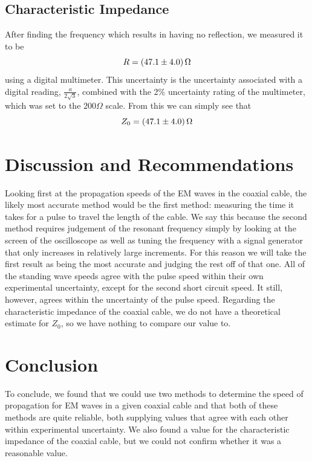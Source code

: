 \documentclass[12pt]{article}
\numberwithin{equation}{section}
\numberwithin{figure}{section}
\begin{document}
    \subsection{Characteristic Impedance}\label{sec:CharacteristicImpedanceResults}
    After finding the frequency which results in having no reflection, we measured it to be 
    \begin{equation*}
        R=\SI{47.1\pm4.0}{\ohm}
    \end{equation*}
    using a digital multimeter. This uncertainty is the uncertainty associated with a digital 
    reading, $\frac{a}{2\sqrt3}$, combined with the 2\% uncertainty rating of the multimeter, 
    which was set to the $200\Omega$ scale. From this we can simply see that 
    \begin{equation*}
        Z_0=\SI{47.1\pm4.0}{\ohm}
    \end{equation*}

    \section{Discussion and Recommendations}\label{sec:DiscussionRecommendations}
    Looking first at the propagation speeds of the EM waves in the coaxial cable, the likely 
    most accurate method would be the first method: measuring the time it takes for a pulse 
    to travel the length of the cable. We say this because the second method requires 
    judgement of the resonant frequency simply by looking at the screen of the oscilloscope as 
    well as tuning the frequency with a signal generator that only increases in relatively 
    large increments. For this reason we will take the first result as being the most accurate 
    and judging the rest off of that one. \newline
    All of the standing wave speeds agree with the pulse speed within their own experimental 
    uncertainty, except for the second short circuit speed. It still, however, agrees within the 
    uncertainty of the pulse speed.\newline
    \newline
    Regarding the characteristic impedance of the coaxial cable, we do not have a theoretical 
    estimate for $Z_0$, so we have nothing to compare our value to.

    \section{Conclusion}\label{sec:Conclusion}
    To conclude, we found that we could use two methods to determine the speed of propagation 
    for EM waves in a given coaxial cable and that both of these methods are quite reliable, both 
    supplying values that agree with each other within experimental uncertainty. We also 
    found a value for the characteristic impedance of the coaxial cable, but we could not 
    confirm whether it was a reasonable value.
    
\end{document}
